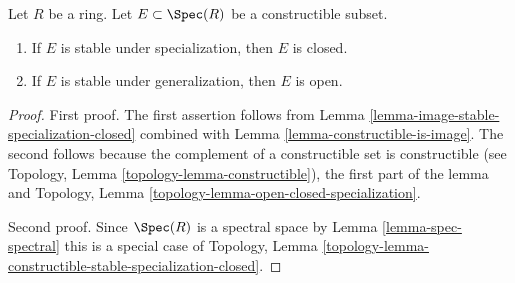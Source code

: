 \begin{lemma}
\label{lemma-constructible-stable-specialization-closed}
Let $R$ be a ring. Let $E \subset \Spec(R)$ be a constructible subset.
\begin{enumerate}
\item If $E$ is stable under specialization, then $E$ is closed.
\item If $E$ is stable under generalization, then $E$ is open.
\end{enumerate}
\end{lemma}

\begin{proof}
First proof. The first assertion
follows from Lemma \ref{lemma-image-stable-specialization-closed}
combined with Lemma \ref{lemma-constructible-is-image}.
The second follows because the complement of a constructible
set is constructible
(see Topology, Lemma \ref{topology-lemma-constructible}),
the first part of the lemma and Topology,
Lemma \ref{topology-lemma-open-closed-specialization}.

\medskip\noindent
Second proof. Since $\Spec(R)$ is a spectral space by
Lemma \ref{lemma-spec-spectral} this is a special case of
Topology, Lemma
\ref{topology-lemma-constructible-stable-specialization-closed}.
\end{proof}